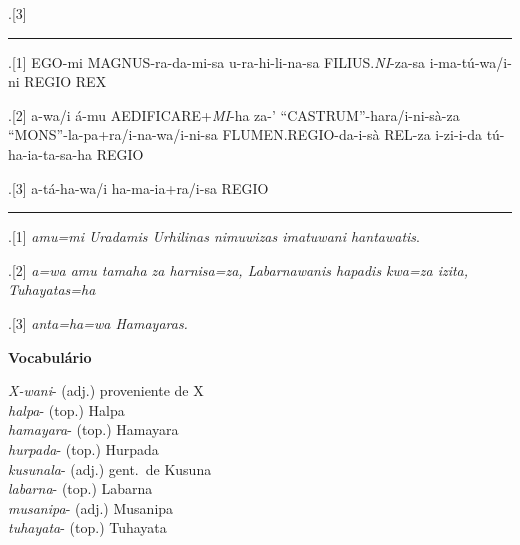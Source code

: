 \begin{flushleft}
\ex.[3] \large {}\hspace{5pt}


\hrule

	\ex.[1]  {EGO-mi}
{MAGNUS-ra-da-mi-sa}
{u-ra-hi-li-na-sa}
{FILIUS.\emph{NI}-za-sa}
{i-ma-tú-wa/i-ni REGIO}
{REX}

\ex.[2] {a-wa/i} {á-mu} {AEDIFICARE+\emph{MI}-ha} {za-'}
{``CASTRUM''-hara/i-ni-sà-za} {``MONS''-la-pa+ra/i-na-wa/i-ni-sa
FLUMEN.REGIO-da-i-sà} {REL-za i-zi-i-da tú-ha-ia-ta-sa-ha REGIO}

\ex.[3] {a-tá-ha-wa/i ha-ma-ia+ra/i-sa REGIO}


\hrule

\ex.[1] \emph{amu=mi Uradamis Urhilinas nimuwizas imatuwani hantawatis}.

\ex.[2] \emph{a=wa amu tamaha za harnisa=za, Labarnawanis hapadis kwa=za izita,
Tuhayatas=ha}

\ex.[3] \emph{anta=ha=wa Hamayaras.}

\end{flushleft}


\noindent\textbf{Vocabulário}
\begin{multicols}{2}
	\noindent \emph{X-wani}- (adj.) proveniente de X\\
	\noindent \emph{halpa}- (top.)  Halpa\\
	\noindent \emph{hamayara}- (top.)  Hamayara\\
	\noindent \emph{hurpada}- (top.)  Hurpada\\
	\noindent \emph{kusunala}- (adj.) gent.\ de Kusuna\\
	\noindent \emph{labarna}- (top.) Labarna \\
	\noindent \emph{musanipa}- (adj.)  Musanipa\\
	\noindent \emph{tuhayata}- (top.)  Tuhayata\\
\end{multicols}
